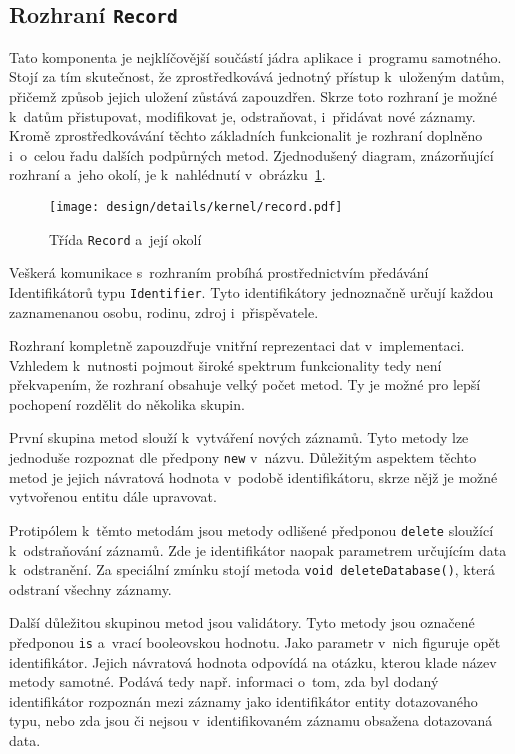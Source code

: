 		\subsection*{Rozhraní \texttt{Record}}
		Tato komponenta je nejklíčovější součástí jádra aplikace i~programu samotného. Stojí za tím skutečnost, že zprostředkovává jednotný přístup k~uloženým datům, přičemž způsob jejich uložení zůstává zapouzdřen. Skrze toto rozhraní je možné k~datům přistupovat, modifikovat je, odstraňovat, i~přidávat nové záznamy. Kromě zprostředkovávání těchto základních funkcionalit je rozhraní doplněno i~o~celou řadu dalších podpůrných metod. Zjednodušený diagram, znázorňující rozhraní a~jeho okolí, je k~nahlédnutí v~obrázku~\ref{fig:designDetailRecord}. \par
		\begin{figure}[H]
			\centering
			\texttt{[image: design/details/kernel/record.pdf]}
			\caption{Třída \texttt{Record} a~její okolí}
			\label{fig:designDetailRecord}
		\end{figure}
		Veškerá komunikace s~rozhraním probíhá prostřednictvím předávání Identifikátorů typu \texttt{Identifier}. Tyto identifikátory jednoznačně určují každou zaznamenanou osobu, rodinu, zdroj i~přispěvatele. \par
		Rozhraní kompletně zapouzdřuje vnitřní reprezentaci dat v~implementaci. Vzhledem k~nutnosti pojmout široké spektrum funkcionality tedy není překvapením, že rozhraní obsahuje velký počet metod. Ty je možné pro lepší pochopení rozdělit do několika skupin. \par
		První skupina metod slouží k~vytváření nových záznamů. Tyto metody lze jednoduše rozpoznat dle předpony \texttt{new} v~názvu. Důležitým aspektem těchto metod je jejich návratová hodnota v~podobě identifikátoru, skrze nějž je možné vytvořenou entitu dále upravovat. \par
		Protipólem k~těmto metodám jsou metody odlišené předponou \texttt{delete} sloužící k~odstraňování záznamů. Zde je identifikátor naopak parametrem určujícím data k~odstranění. Za speciální zmínku stojí metoda \texttt{void deleteDatabase()}, která odstraní všechny záznamy. \par
		Další důležitou skupinou metod jsou validátory. Tyto metody jsou označené předponou \texttt{is} a~vrací booleovskou hodnotu. Jako parametr v~nich figuruje opět identifikátor. Jejich návratová hodnota odpovídá na otázku, kterou klade název metody samotné. Podává tedy např. informaci o~tom, zda byl dodaný identifikátor rozpoznán mezi záznamy jako identifikátor entity dotazovaného typu, nebo zda jsou či nejsou v~identifikovaném záznamu obsažena dotazovaná data. \par
